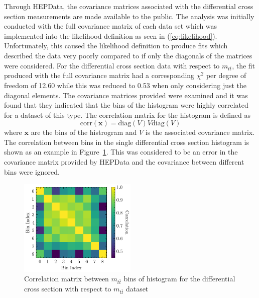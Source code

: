 \documentclass[a4paper,11pt]{article}
\renewcommand{\vec}{\mathbf}
\begin{document}
Through HEPData, the covariance matrices associated with the differential cross section measurements are made available to the public.
The analysis was initially conducted with the full covariance matrix of each data set which was implemented into the likelihood definition as seen in (\ref{eq:likelihood}).
Unfortunately, this caused the likelihood definition to produce fits which described the data very poorly compared to if only the diagonals of the matrices were considered.
For the differential cross section data with respect to $m_{t\bar{t}}$, the fit produced with the full covariance matrix had a corresponding $\chi^2$ per degree of freedom of 12.60 while this was reduced to 0.53 when only considering just the diagonal elements.
The covariance matrices provided were examined and it was found that they indicated that the bins of the histogram were highly correlated for a dataset of this type.
The correlation matrix for the histogram is defined as
\begin{equation}
    \textrm{corr}(\vec{x}) = \textrm{diag}(V) V \textrm{diag}(V)
\end{equation}
where $\vec{x}$ are the bins of the histrogram and $V$ is the associated covariance matrix.
The correlation between bins in the single differential cross section histogram is shown as an example in Figure~\ref{fig:correlation}.
This was considered to be an error in the covariance matrix provided by HEPData and the covariance between different bins were ignored.

\begin{figure}[H]
    \centering
    \includegraphics[width=0.5\textwidth]{plots/correlation.png}
    \caption{Correlation matrix between $m_{t\bar{t}}$ bins of histogram for the differential cross section with respect to $m_{t\bar{t}}$ dataset}
    \label{fig:correlation}
\end{figure}
\end{document}
